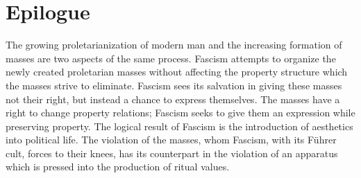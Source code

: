 \documentclass[11pt, letterpaper]{article}
\begin{document}
\section*{Epilogue}

The growing proletarianization of modern man and the increasing formation of
masses are two aspects of the same process. Fascism attempts to organize the
newly created proletarian masses without affecting the property structure which
the masses strive to eliminate. Fascism sees its salvation in giving these
masses not their right, but instead a chance to express themselves. The masses
have a right to change property relations; Fascism seeks to give them an
expression while preserving property. The logical result of Fascism is the
introduction of aesthetics into political life. The violation of the masses,
whom Fascism, with its Führer cult, forces to their knees, has its counterpart
in the violation of an apparatus which is pressed into the production of ritual
values.
\end{document}
